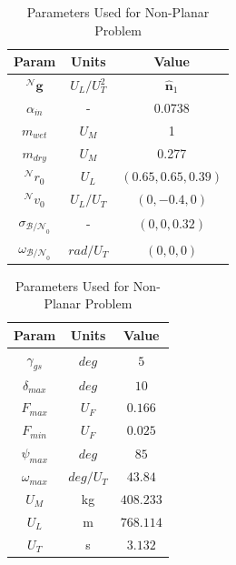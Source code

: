 \begin{table}[ht]
\caption{Parameters Used for Non-Planar Problem}
\centering 
\begin{tabular}{c c c} 
\hline\hline
Param & Units & Value \\ [0.5ex] 
\hline 
$^\mathcal{N}\mathbf{g}$ 		& $U_L/U_T^2$ 	& $\hat{\mathbf{n}}_1$  \\ 
$\alpha_{\dot{m}}$ 				& - 			& 0.0738  \\
$m_{wet}$ 						& $U_M$ 		& 1  \\
$m_{dry}$ 						& $U_M$ 		& 0.277  \\
$^\mathcal{N}r_{0}$ 			& $U_L$ 		& $(0.65,0.65,0.39)$  \\
$^\mathcal{N}v_{0}$ 			& $U_L/U_T$	 	& $(0,-0.4,0)$  \\
$\sigma_{\mathcal{B/N}_0}$ 		& - 			& $(0,0,0.32)$  \\
$\omega_{\mathcal{B/N}_0}$ 		& $rad/U_T$ 	& $(0,0,0)$ \\[1ex] 
\hline
\end{tabular}
\begin{tabular}{c c c} 
\hline\hline
Param & Units & Value \\ [0.5ex] 
\hline 
$\gamma_{gs}$ 					& $deg$ 		& $5$  \\ 
$\delta_{max}$	 				& $deg$ 		& $10$  \\
$F_{max}$ 						& $U_F$ 		& $0.166$ \\
$F_{min}$ 						& $U_F$ 		& $0.025$  \\
$\psi_{max}$ 					& $deg$ 		& $85$  \\
$\omega_{max}$ 					& $deg/U_T$	 	& $43.84$  \\
$U_M$ 							& kg 			& $408.233$  \\
$U_L$					 		& m			 	& $768.114$ \\
$U_T$					 		& s			 	& $3.132$ \\[1ex] 
\hline
\end{tabular}
\label{table:tablenplanar}
\end{table}










